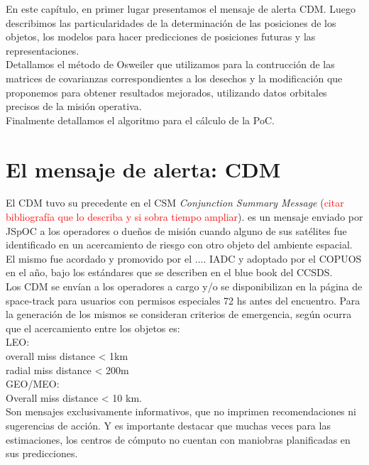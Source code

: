En este cap\'itulo, en primer lugar presentamos el mensaje de alerta \ac{CDM}. Luego describimos las particularidades de la determinaci\'on de las posiciones de los objetos, los modelos para hacer predicciones de posiciones futuras y las representaciones.\\
Detallamos el m\'etodo de Osweiler \citep{Osweiler} que utilizamos para la contrucci\'on de las matrices de covarianzas correspondientes a los desechos y la modificaci\'on que proponemos para obtener resultados mejorados, utilizando datos orbitales precisos de la misi\'on operativa. \\
Finalmente detallamos el algoritmo para el c\'alculo de la PoC.\\


\section{El mensaje de alerta: CDM}

El CDM tuvo su precedente en el CSM {\it{Conjunction Summary Message}} (\textcolor{red}{citar bibliograf\'ia que lo describa y si sobra tiempo ampliar}).  es un mensaje enviado por JSpOC a los operadores o due\~nos de misi\'on cuando alguno de sus sat\'elites fue identificado en un acercamiento de riesgo con otro objeto del ambiente espacial.\\
El mismo fue acordado y promovido por el .... IADC y adoptado por el COPUOS en el a\~no, bajo los est\'andares que se describen en el blue book del CCSDS. \\
Los CDM se env\'ian a los operadores a cargo y/o se disponibilizan en la p\'agina de space-track para usuarios con permisos especiales 72 hs antes del encuentro. Para la generaci\'on de los mismos se consideran criterios de emergencia, seg\'un ocurra que el acercamiento entre los objetos es:\\

LEO:\\
overall miss distance < 1km\\
radial miss distance < 200m\\
GEO/MEO:\\
Overall miss distance < 10 km.\\

Son mensajes exclusivamente informativos, que no imprimen recomendaciones ni sugerencias de acci\'on.
Y es importante destacar que muchas veces para las estimaciones, los centros de c\'omputo no cuentan con maniobras planificadas en sus predicciones.\\ 

